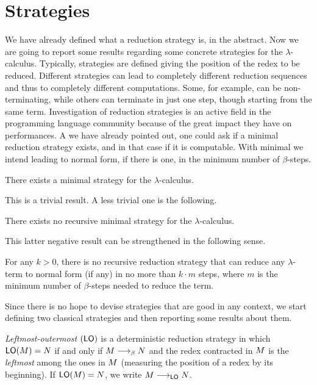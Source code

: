 \section{Strategies}
We have already defined what a reduction strategy is, in the abstract. Now we are going to report some results regarding some concrete strategies for the $\lambda$-calculus. Typically, strategies are defined giving the position of the redex to be reduced. Different strategies can lead to completely different reduction sequences and thus to completely different computations. Some, for example, can be non-terminating, while others can terminate in just one step, though starting from the same term. Investigation of reduction strategies is an active field in the programming language community because of the great impact they have on performances. A we have already pointed out, one could ask if a minimal reduction strategy exists, and in that case if it is computable. With minimal we intend leading to normal form, if there is one, in the minimum number of $\beta$-steps.
\begin{proposition}
	There exists a minimal strategy for the $\lambda$-calculus.
\end{proposition}
This is a trivial result. A less trivial one is the following.
\begin{theorem}
	There exists no recursive minimal strategy for the $\lambda$-calculus.
\end{theorem}
This latter negative result can be strengthened in the following sense.
\begin{theorem}
	For any $k>0$, there is no recursive reduction strategy that can reduce any $\lambda$-term to normal form (if any) in no more than $k\cdot m$ steps, where $m$ is the minimum number of $\beta$-steps needed to reduce the term.
\end{theorem}
Since there is no hope to devise strategies that are good in any context, we start defining two classical strategies and then reporting some results about them.
\begin{definition}
	\emph{Leftmost-outermost} $(\textsf{LO})$ is a deterministic reduction
	strategy in which $\textsf{LO}(M)=N$ if and only if
	$M\longrightarrow_\beta N$ and the redex contracted in $M$ is
	the \emph{leftmost} among the ones in $M$ (measuring the
	position of a redex by its beginning). If $\textsf{LO}(M)=N$,
	we write $M\longrightarrow_{\textsf{LO}}N$.
\end{definition}
